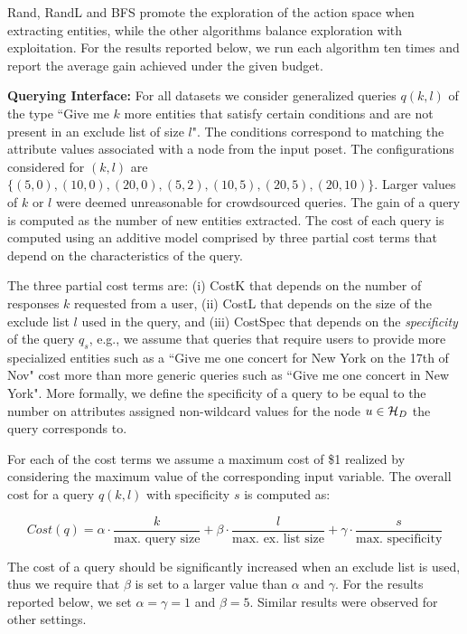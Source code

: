 Rand, RandL and BFS promote the exploration of the action space when extracting entities, while the other algorithms balance exploration with exploitation. For the results reported below, we run each algorithm ten times and report the average gain achieved under the given budget.

\vspace{5pt}\noindent\textbf{Querying Interface:} For all datasets we consider generalized queries $q(k,l)$ of the type ``Give me $k$ more entities that satisfy certain conditions and are not present in an exclude list of size $l$". The conditions correspond to matching the attribute values associated with a node from the input poset. The  configurations considered for $(k,l)$ are $\{(5,0), (10,0), (20,0), (5,2), (10,5), (20,5), (20,10)\}$. Larger values of $k$ or $l$ were deemed unreasonable for crowdsourced queries. The gain of a query is computed as the number of new entities extracted. The cost of each query is computed using an additive model comprised by three partial cost terms that depend on the characteristics of the query. 

The three partial cost terms are: (i) {\sf CostK} that depends on the number of responses $k$ requested from a user, (ii) {\sf CostL} that depends on the size of the exclude list $l$ used in the query, and (iii) {\sf CostSpec} that depends on the {\em specificity} of the query $q_s$, e.g., we assume that queries that require users to provide more specialized entities such as a ``Give me one concert for New York on the 17th of Nov" cost more than more generic queries such as ``Give me one concert in New York". More formally, we define the specificity of a query to be equal to the number on attributes assigned non-wildcard values for the node $u \in \mathcal{H}_D$ the query corresponds to. 

For each of the cost terms we assume a maximum cost of \$1 realized by considering the maximum value of the corresponding input variable. The overall cost for a query $q(k,l)$ with specificity $s$ is computed as:

{\small
\begin{equation}
Cost(q) = \alpha \cdot \frac{k}{\mbox{max. query size}} + \beta \cdot  \frac{l}{\mbox{max. ex. list size}} + \gamma \cdot  \frac{s}{\mbox{max. specificity}} \nonumber
\end{equation}}

The cost of a query should be significantly increased when an exclude list is used, thus we require that $\beta$ is set to a larger value than $\alpha$ and $\gamma$. For the results reported below, we set $\alpha = \gamma = 1$ and $\beta = 5$. Similar results were observed for other settings.

